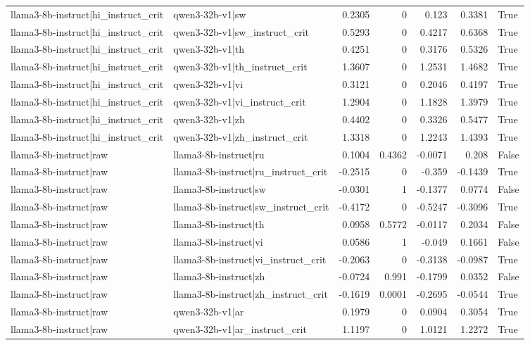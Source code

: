 \begin{table}
\begin{tabular}{l l r r r r l}
llama3-8b-instruct|hi_instruct_crit & qwen3-32b-v1|sw & 0.2305 & 0 & 0.123 & 0.3381 & True \\
llama3-8b-instruct|hi_instruct_crit & qwen3-32b-v1|sw_instruct_crit & 0.5293 & 0 & 0.4217 & 0.6368 & True \\
llama3-8b-instruct|hi_instruct_crit & qwen3-32b-v1|th & 0.4251 & 0 & 0.3176 & 0.5326 & True \\
llama3-8b-instruct|hi_instruct_crit & qwen3-32b-v1|th_instruct_crit & 1.3607 & 0 & 1.2531 & 1.4682 & True \\
llama3-8b-instruct|hi_instruct_crit & qwen3-32b-v1|vi & 0.3121 & 0 & 0.2046 & 0.4197 & True \\
llama3-8b-instruct|hi_instruct_crit & qwen3-32b-v1|vi_instruct_crit & 1.2904 & 0 & 1.1828 & 1.3979 & True \\
llama3-8b-instruct|hi_instruct_crit & qwen3-32b-v1|zh & 0.4402 & 0 & 0.3326 & 0.5477 & True \\
llama3-8b-instruct|hi_instruct_crit & qwen3-32b-v1|zh_instruct_crit & 1.3318 & 0 & 1.2243 & 1.4393 & True \\
llama3-8b-instruct|raw & llama3-8b-instruct|ru & 0.1004 & 0.4362 & -0.0071 & 0.208 & False \\
llama3-8b-instruct|raw & llama3-8b-instruct|ru_instruct_crit & -0.2515 & 0 & -0.359 & -0.1439 & True \\
llama3-8b-instruct|raw & llama3-8b-instruct|sw & -0.0301 & 1 & -0.1377 & 0.0774 & False \\
llama3-8b-instruct|raw & llama3-8b-instruct|sw_instruct_crit & -0.4172 & 0 & -0.5247 & -0.3096 & True \\
llama3-8b-instruct|raw & llama3-8b-instruct|th & 0.0958 & 0.5772 & -0.0117 & 0.2034 & False \\
llama3-8b-instruct|raw & llama3-8b-instruct|vi & 0.0586 & 1 & -0.049 & 0.1661 & False \\
llama3-8b-instruct|raw & llama3-8b-instruct|vi_instruct_crit & -0.2063 & 0 & -0.3138 & -0.0987 & True \\
llama3-8b-instruct|raw & llama3-8b-instruct|zh & -0.0724 & 0.991 & -0.1799 & 0.0352 & False \\
llama3-8b-instruct|raw & llama3-8b-instruct|zh_instruct_crit & -0.1619 & 0.0001 & -0.2695 & -0.0544 & True \\
llama3-8b-instruct|raw & qwen3-32b-v1|ar & 0.1979 & 0 & 0.0904 & 0.3054 & True \\
llama3-8b-instruct|raw & qwen3-32b-v1|ar_instruct_crit & 1.1197 & 0 & 1.0121 & 1.2272 & True \\

\end{tabular}
\end{table}
